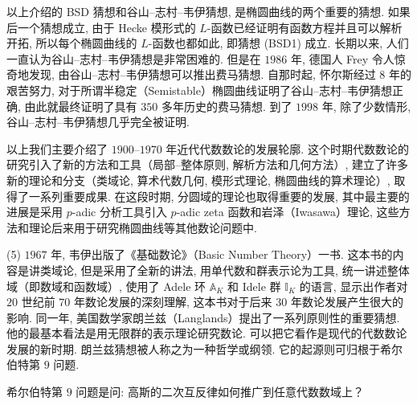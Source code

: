 以上介绍的 BSD 猜想和谷山--志村--韦伊猜想, 是椭圆曲线的两个重要的猜想. 如果后一个猜想成立, 由于 Hecke 模形式的 $L$-函数已经证明有函数方程并且可以解析开拓, 所以每个椭圆曲线的 $L$-函数也都如此, 即猜想 (BSD1) 成立. 长期以来, 人们一直认为谷山--志村--韦伊猜想是非常困难的. 但是在 $1986$ 年, 德国人 Frey 令人惊奇地发现, 由谷山--志村--韦伊猜想可以推出费马猜想. 自那时起, 怀尔斯经过 $8$ 年的艰苦努力, 对于所谓半稳定（Semistable）椭圆曲线证明了谷山--志村--韦伊猜想正确, 由此就最终证明了具有 $350$ 多年历史的费马猜想. 到了 $1998$ 年, 除了少数情形, 谷山--志村--韦伊猜想几乎完全被证明.

以上我们主要介绍了 $1900$--$1970$ 年近代代数数论的发展轮廓. 这个时期代数数论的研究引入了新的方法和工具（局部--整体原则, 解析方法和几何方法）, 建立了许多新的理论和分支（类域论, 算术代数几何, 模形式理论, 椭圆曲线的算术理论）, 取得了一系列重要成果. 在这段时期, 分圆域的理论也取得重要的发展, 其中最主要的进展是采用 $p$-adic 分析工具引入 $p$-adic zeta 函数和岩泽（Iwasawa）理论, 这些方法和理论后来用于研究椭圆曲线等其他数论问题中.

(5) $1967$ 年, 韦伊出版了《基础数论》（Basic Number Theory）一书. 这本书的内容是讲类域论, 但是采用了全新的讲法, 用单代数和群表示论为工具, 统一讲述整体域（即数域和函数域）, 使用了 Adele 环 $\mathbb{A}_K$ 和 Idele 群 $\mathbb{I}_K$ 的语言, 显示出作者对 $20$ 世纪前 $70$ 年数论发展的深刻理解, 这本书对于后来 $30$ 年数论发展产生很大的影响. 同一年, 美国数学家朗兰兹（Langlands）提出了一系列原则性的重要猜想. 他的最基本看法是用无限群的表示理论研究数论. 可以把它看作是现代的代数数论发展的新时期. 朗兰兹猜想被人称之为一种哲学或纲领. 它的起源则可归根于希尔伯特第 $9$ 问题.

希尔伯特第 $9$ 问题是问: 高斯的二次互反律如何推广到任意代数数域上？

